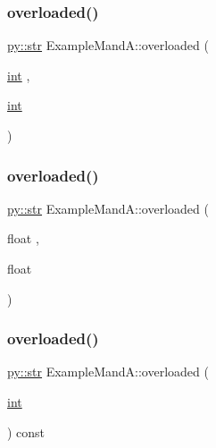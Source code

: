 \mbox{\label{class_example_mand_a_af3fa144500b9ca068315b1ccc3999692}} 
\subsubsection{\texorpdfstring{overloaded()}{overloaded()}\hspace{0.1cm}{\footnotesize\ttfamily [5/12]}}
{\footnotesize\ttfamily \mbox{\hyperlink{node_8h_a62b34ca1362fe946082b7aa0cd9be844}{py\+::str}} Example\+Mand\+A\+::overloaded (\begin{DoxyParamCaption}\item[{\mbox{\hyperlink{warnings_8h_a74f207b5aa4ba51c3a2ad59b219a423b}{int}}}]{,  }\item[{\mbox{\hyperlink{warnings_8h_a74f207b5aa4ba51c3a2ad59b219a423b}{int}}}]{ }\end{DoxyParamCaption})\hspace{0.3cm}{\ttfamily [inline]}}

\mbox{\label{class_example_mand_a_a1c17929f7b06343c234bb5dc0a887fe7}} 
\subsubsection{\texorpdfstring{overloaded()}{overloaded()}\hspace{0.1cm}{\footnotesize\ttfamily [6/12]}}
{\footnotesize\ttfamily \mbox{\hyperlink{node_8h_a62b34ca1362fe946082b7aa0cd9be844}{py\+::str}} Example\+Mand\+A\+::overloaded (\begin{DoxyParamCaption}\item[{float}]{,  }\item[{float}]{ }\end{DoxyParamCaption})\hspace{0.3cm}{\ttfamily [inline]}}

\mbox{\label{class_example_mand_a_a3532f536983bb2bcc533934e867ae907}} 
\subsubsection{\texorpdfstring{overloaded()}{overloaded()}\hspace{0.1cm}{\footnotesize\ttfamily [7/12]}}
{\footnotesize\ttfamily \mbox{\hyperlink{node_8h_a62b34ca1362fe946082b7aa0cd9be844}{py\+::str}} Example\+Mand\+A\+::overloaded (\begin{DoxyParamCaption}\item[{\mbox{\hyperlink{warnings_8h_a74f207b5aa4ba51c3a2ad59b219a423b}{int}}}]{ }\end{DoxyParamCaption}) const\hspace{0.3cm}{\ttfamily [inline]}}

